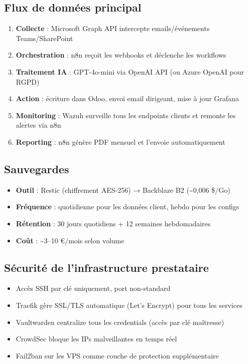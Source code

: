 \subsection{Flux de données principal}

\begin{enumerate}
  \item \textbf{Collecte} : Microsoft Graph API intercepte emails/événements Teams/SharePoint
  \item \textbf{Orchestration} : n8n reçoit les webhooks et déclenche les workflows
  \item \textbf{Traitement IA} : GPT-4o-mini via OpenAI API (ou Azure OpenAI pour RGPD)
  \item \textbf{Action} : écriture dans Odoo, envoi email dirigeant, mise à jour Grafana
  \item \textbf{Monitoring} : Wazuh surveille tous les endpoints clients et remonte les alertes via n8n
  \item \textbf{Reporting} : n8n génère PDF mensuel et l'envoie automatiquement
\end{enumerate}

\subsection{Sauvegardes}

\begin{itemize}
  \item \textbf{Outil} : Restic (chiffrement AES-256) → Backblaze B2 (\~{}0,006 \$/Go)
  \item \textbf{Fréquence} : quotidienne pour les données client, hebdo pour les configs
  \item \textbf{Rétention} : 30 jours quotidiens + 12 semaines hebdomadaires
  \item \textbf{Coût} : \~{}3–10 €/mois selon volume
\end{itemize}

\subsection{Sécurité de l'infrastructure prestataire}

\begin{itemize}
  \item Accès SSH par clé uniquement, port non-standard
  \item Traefik gère SSL/TLS automatique (Let's Encrypt) pour tous les services
  \item Vaultwarden centralize tous les credentials (accès par clé maîtresse)
  \item CrowdSec bloque les IPs malveillantes en temps réel
  \item Fail2ban sur les VPS comme couche de protection supplémentaire
\end{itemize}
